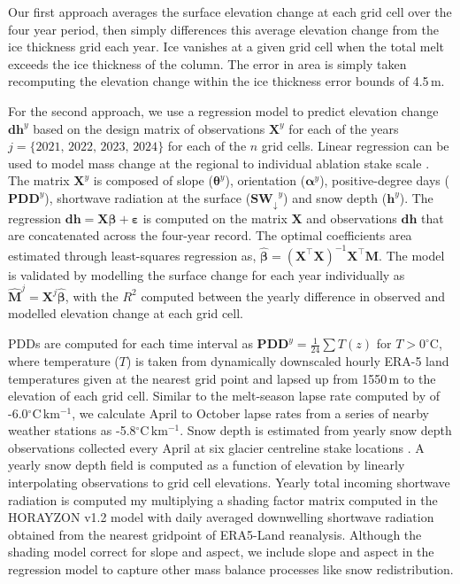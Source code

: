 \documentclass[annals,twocolumn,letterpaper]{igs}
\begin{document}
Our first approach averages the surface elevation change at each grid cell over the four year period, then simply differences this average elevation change from the ice thickness grid each year. Ice vanishes at a given grid cell when the total melt exceeds the ice thickness of the column. The error in area is simply taken recomputing the elevation change within the ice thickness error bounds of 4.5\,m. 

For the second approach, we use a regression model to predict elevation change $\mathbf{dh}^{y}$ based on the design matrix of observations $\mathbf{X}^{y}$ for each of the years $j=\{2021,\,2022,\,2023,\,2024\}$ for each of the $n$ grid cells. Linear regression can be used to model mass change at the regional \citep{Lliboutry1974,Anilkumar2023,Reynaud1986} to individual ablation stake scale \citep{Zekollari2018}. The matrix $\mathbf{X}^{y}$ is composed of slope ($\boldsymbol{\theta}^{y}$), orientation ($\boldsymbol{\alpha}^{y}$), positive-degree days ($\mathbf{PDD}^{y}$), shortwave radiation at the surface ($\mathbf{SW_{\downarrow}}^{y}$) and snow depth ($\mathbf{h}^{y}$). The regression $\mathbf{dh} = \mathbf{X} \boldsymbol{\beta} + \boldsymbol{\varepsilon}$ is computed on the matrix $\mathbf{X}$ and observations $\mathbf{dh}$ that are concatenated across the four-year record. The optimal coefficients area estimated through least-squares regression as, $\hat{\boldsymbol{\beta}} = (\mathbf{X}^\top \mathbf{X})^{-1} \mathbf{X}^\top \mathbf{M}$. The model is validated by modelling the surface change for each year individually as $\hat{\mathbf{M}}^{j} = \mathbf{X}^{j} \hat{\boldsymbol{\beta}}$, with the $R^2$ computed between the yearly difference in observed and modelled elevation change at each grid cell. 

PDDs are computed for each time interval as $\mathbf{PDD}^y = \frac{1}{24}\sum T(z)$ for $T>0^{\circ}$C, where temperature ($T$) is taken from dynamically downscaled hourly ERA-5 land temperatures \citep{Hersbach2020} given at the nearest grid point and lapsed up from 1550\,m to the elevation of each grid cell. Similar to the melt-season lapse rate computed by \cite{Shea2009} of -6.0$\mathrm{^{\circ}C\,km^{-1}}$, we calculate April to October lapse rates from a series of nearby weather stations as -5.8$\mathrm{^{\circ}C\,km^{-1}}$. Snow depth is estimated from yearly snow depth observations collected every April at six glacier centreline stake locations . A yearly snow depth field is computed as a function of elevation by linearly interpolating observations to grid cell elevations. Yearly total incoming shortwave radiation is computed my multiplying a shading factor matrix computed in the HORAYZON v1.2 model \citep{Steger2022} with daily averaged downwelling shortwave radiation obtained from the nearest gridpoint of ERA5-Land reanalysis. Although the shading model correct for slope and aspect, we include slope and aspect in the regression model to capture other mass balance processes like snow redistribution.
\end{document}
